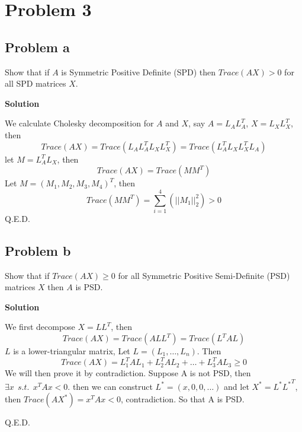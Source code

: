 \documentclass[12pt,oneside,a4paper]{article}
\newcommand{\problem}[1]
{
    \clearpage
    \section*{Problem {#1}}
}
\newcommand{\subproblem}[1]
{
    \subsection*{Problem {#1}}
}
\newcommand{\solution}
{
    \vspace{15pt}
    \noindent\ignorespaces\textbf{\large Solution}\par
}
\begin{document}
\problem{3}

\subproblem{a}
Show that if $A$ is Symmetric Positive Definite (SPD) then $Trace(AX) > 0$ for all SPD matrices $X$.

\solution
We calculate Cholesky decomposition for $A$ and $X$, say $A = L_{A}L_{A}^{T}$, $X = L_{X}L_{X}^{T}$, then
$$Trace(AX) = Trace(L_{A}L_{A}^{T}L_{X}L_{X}^{T}) = Trace(L_{A}^{T}L_{X}L_{X}^{T}L_{A})$$
let $M = L_{A}^{T}L_{X}$, then 
$$Trace(AX) = Trace(MM^{T})$$
Let $M = (M_{1}, M_{2}, M_{3}, M_{4})^{T}$, then 
$$Trace(MM^{T}) = \sum_{i = 1}^{4}(||M_{1}||_{2}^{2}) > 0 $$
Q.E.D.

\subproblem{b}
Show that if $Trace(AX) \geq 0$ for all Symmetric Positive Semi-Definite (PSD) matrices $X$ then $A$ is PSD.

\solution
We first decompose $X = LL^{T}$, then
$$Trace(AX) = Trace(ALL^{T}) = Trace(L^{T}AL)$$
$L$ is a lower-triangular matrix, Let $L = (L_{1},\dots,L_{n})$. Then
$$Trace(AX) = L_{1}^{T}AL_{1} + L_{2}^{T}AL_{2} + \dots + L_{3}^{T}AL_{3} \geq 0$$
We will then prove it by contradiction. Suppose A is not PSD, then $\exists x~~s.t.~~x^{T}Ax < 0$. then we can construct $L^{*} = (x, 0, 0, \dots)$ and let $X^{*} = L^{*}{L^{*}}^{T}$, then $Trace(AX^{*}) =  x^{T}Ax < 0$, contradiction. So that A is PSD.\par Q.E.D.
\end{document}
